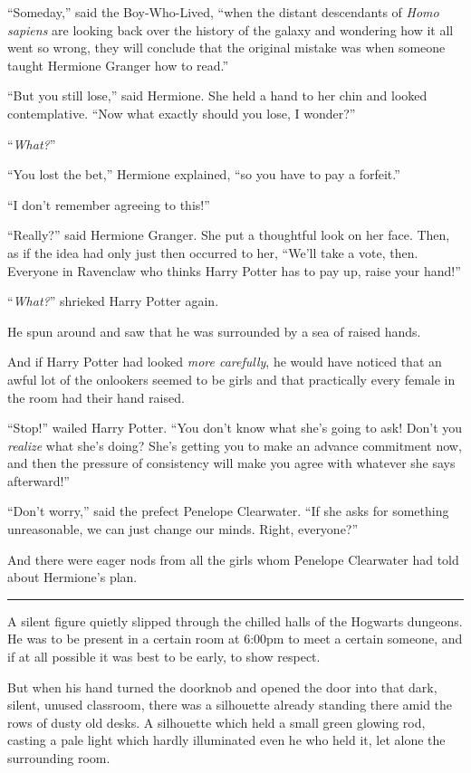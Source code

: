 ``Someday,'' said the Boy-Who-Lived, ``when the distant descendants of \emph{Homo sapiens} are looking back over the history of the galaxy and wondering how it all went so wrong, they will conclude that the original mistake was when someone taught Hermione Granger how to read.''

``But you still lose,'' said Hermione. She held a hand to her chin and looked contemplative. ``Now what exactly should you lose, I wonder?''

``\emph{What?}''

``You lost the bet,'' Hermione explained, ``so you have to pay a forfeit.''

``I don't remember agreeing to this!''

``Really?'' said Hermione Granger. She put a thoughtful look on her face. Then, as if the idea had only just then occurred to her, ``We'll take a vote, then. Everyone in Ravenclaw who thinks Harry Potter has to pay up, raise your hand!''

``\emph{What?}'' shrieked Harry Potter again.

He spun around and saw that he was surrounded by a sea of raised hands.

And if Harry Potter had looked \emph{more carefully}, he would have noticed that an awful lot of the onlookers seemed to be girls and that practically every female in the room had their hand raised.

``Stop!'' wailed Harry Potter. ``You don't know what she's going to ask! Don't you \emph{realize} what she's doing? She's getting you to make an advance commitment now, and then the pressure of consistency will make you agree with whatever she says afterward!''

``Don't worry,'' said the prefect Penelope Clearwater. ``If she asks for something unreasonable, we can just change our minds. Right, everyone?''

And there were eager nods from all the girls whom Penelope Clearwater had told about Hermione's plan.

\begin{center}\rule{3in}{0.4pt}\end{center}

A silent figure quietly slipped through the chilled halls of the Hogwarts dungeons. He was to be present in a certain room at 6:00pm to meet a certain someone, and if at all possible it was best to be early, to show respect.

But when his hand turned the doorknob and opened the door into that dark, silent, unused classroom, there was a silhouette already standing there amid the rows of dusty old desks. A silhouette which held a small green glowing rod, casting a pale light which hardly illuminated even he who held it, let alone the surrounding room.

